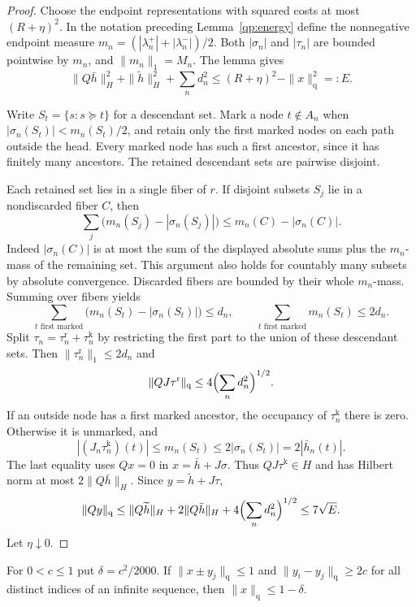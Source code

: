 \begin{proof}
Choose the endpoint representations with squared costs at most
$(R+\eta)^2$.  In the notation preceding Lemma~\ref{qp:energy}
define the nonnegative endpoint measure
$m_n=(|\lambda_n^+|+|\lambda_n^-|)/2$.
Both $|\sigma_n|$ and $|\tau_n|$ are bounded pointwise by $m_n$,
and $\|m_n\|_1=M_n$.  The lemma gives
\begin{equation}\label{qp:seven-energy}
 \|Q\bar h\|_H^2+\|\widetilde h\|_H^2+\sum_nd_n^2
 \le (R+\eta)^2-\|x\|_{\mathrm q}^2=:E.
\end{equation}

Write $S_t=\{s:s\succeq t\}$ for a descendant set.  Mark a node
$t\notin A_n$ when
$|\sigma_n(S_t)|<m_n(S_t)/2$, and retain only the first marked
nodes on each path outside the head.  Every marked node has such
a first ancestor, since it has finitely many ancestors.  The
retained descendant sets are pairwise disjoint.

Each retained set lies in a single fiber of $r$.  If disjoint
subsets $S_j$ lie in a nondiscarded fiber $C$, then
\[
 \sum_j\bigl(m_n(S_j)-|\sigma_n(S_j)|\bigr)
 \le m_n(C)-|\sigma_n(C)|.
\]
Indeed $|\sigma_n(C)|$ is at most the sum of the displayed absolute
sums plus the $m_n$-mass of the remaining set.  This argument also
holds for countably many subsets by absolute convergence.
Discarded fibers are bounded by their whole $m_n$-mass.  Summing
over fibers yields
\[
 \sum_{t\text{ first marked}}
      \bigl(m_n(S_t)-|\sigma_n(S_t)|\bigr)\le d_n,
 \qquad
 \sum_{t\text{ first marked}}m_n(S_t)\le2d_n.
\]
Split $\tau_n=\tau_n^{\mathrm r}+\tau_n^{\mathrm k}$ by
restricting the first part to the union of these descendant sets.
Then $\|\tau_n^{\mathrm r}\|_1\le2d_n$ and
\[
 \|QJ\tau^{\mathrm r}\|_{\mathrm q}
          \le4\Bigl(\sum_nd_n^2\Bigr)^{1/2}.
\]
If an outside node has a first marked ancestor, the occupancy of
$\tau_n^{\mathrm k}$ there is zero.  Otherwise it is unmarked, and
\[
 |(J_n\tau_n^{\mathrm k})(t)|
 \le m_n(S_t)\le2|\sigma_n(S_t)|=2|\bar h_n(t)|.
\]
The last equality uses $Qx=0$ in $x=\bar h+J\sigma$.
Thus $QJ\tau^{\mathrm k}\in H$ and has Hilbert norm at most
$2\|Q\bar h\|_H$.  Since $y=\widetilde h+J\tau$,
\[
 \|Qy\|_{\mathrm q}
 \le\|Q\widetilde h\|_H+2\|Q\bar h\|_H
           +4\Bigl(\sum_nd_n^2\Bigr)^{1/2}
 \le7\sqrt E.
\]
Let $\eta\downarrow0$.
\end{proof}

\begin{corollary}\label{qp:lens-seven}
For $0<c\le1$ put $\delta=c^2/2000$.  If
$\|x\pm y_j\|_{\mathrm q}\le1$ and
$\|y_i-y_j\|_{\mathrm q}\ge2c$ for all distinct indices of an
infinite sequence, then $\|x\|_{\mathrm q}\le1-\delta$.
\end{corollary}

